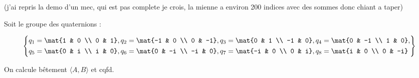 (j'ai repris la demo d'un mec, qui est pas complete je crois, la mienne a environ 200 indices avec des sommes donc chiant a taper)

Soit le groupe des quaternions :

\[
\left\{
\begin{aligned}
  &q_1 = \mat{1 & 0 \\ 0 & 1},  q_2 = \mat{-1 & 0 \\ 0 & -1},  q_3 = \mat{0 & 1 \\ -1 & 0}, q_4= \mat{0 & -1 \\ 1 & 0}, \\
  &q_5 = \mat{0 & i \\ i & 0},  q_6 = \mat{0 & -i \\ -i & 0}, q_7= \mat{-i & 0 \\ 0 & i},  q_8 = \mat{i & 0 \\ 0 & -i}                   
\end{aligned}
\right\} 
\]

On calcule bêtement $\langle A, B \rangle$ et cqfd.